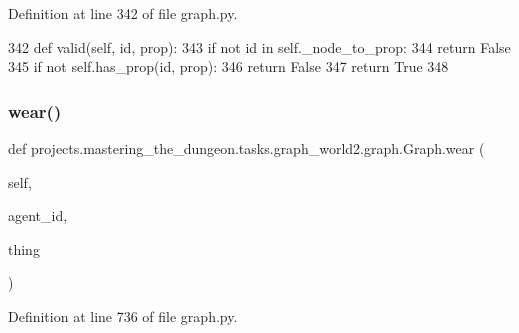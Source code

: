 Definition at line 342 of file graph.\+py.


\begin{DoxyCode}
342     \textcolor{keyword}{def }valid(self, id, prop):
343         \textcolor{keywordflow}{if} \textcolor{keywordflow}{not} id \textcolor{keywordflow}{in} self.\_node\_to\_prop:
344             \textcolor{keywordflow}{return} \textcolor{keyword}{False}
345         \textcolor{keywordflow}{if} \textcolor{keywordflow}{not} self.has\_prop(id, prop):
346             \textcolor{keywordflow}{return} \textcolor{keyword}{False}
347         \textcolor{keywordflow}{return} \textcolor{keyword}{True}
348 
\end{DoxyCode}
\mbox{\label{classprojects_1_1mastering__the__dungeon_1_1tasks_1_1graph__world2_1_1graph_1_1Graph_a3e325f222b98c939673190da0f1f4b79}} 
\subsubsection{\texorpdfstring{wear()}{wear()}}
{\footnotesize\ttfamily def projects.\+mastering\+\_\+the\+\_\+dungeon.\+tasks.\+graph\+\_\+world2.\+graph.\+Graph.\+wear (\begin{DoxyParamCaption}\item[{}]{self,  }\item[{}]{agent\+\_\+id,  }\item[{}]{thing }\end{DoxyParamCaption})}



Definition at line 736 of file graph.\+py.



